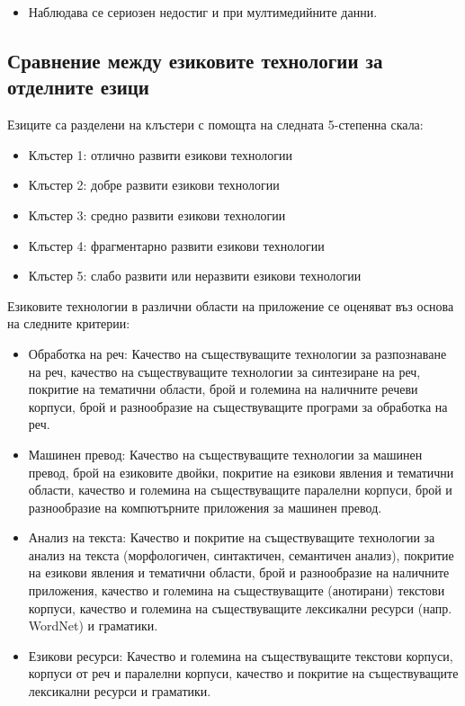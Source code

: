 \begin{multicols}{2}
\begin{itemize}
\item Наблюдава се сериозен недостиг и при мултимедийните данни.

\end{itemize}


\subsection{Сравнение между езиковите технологии за отделните езици}

Езиците са разделени на клъстери с помощта на следната 5-степенна скала:
\begin{itemize}
\item Клъстер 1: отлично развити езикови технологии
\item Клъстер 2: добре развити езикови технологии
\item Клъстер 3: средно развити езикови технологии
\item Клъстер 4: фрагментарно развити езикови технологии
\item Клъстер 5: слабо развити или неразвити езикови технологии
\end{itemize}

Езиковите технологии в различни области на приложение се оценяват въз основа на следните критерии:
\begin{itemize}
\item Обработка на реч: Качество на съществуващите технологии за разпознаване на реч, качество на съществуващите технологии за синтезиране на реч, покритие на тематични области, брой и големина на наличните речеви корпуси, брой и разнообразие на съществуващите програми за обработка на реч.
\item Машинен превод: Качество на съществуващите технологии за машинен превод, брой на езиковите двойки, покритие на езикови явления и тематични области, качество и големина на съществуващите паралелни корпуси, брой и разнообразие на компютърните приложения за машинен превод.
\item Анализ на текста: Качество и покритие на съществуващите технологии за анализ на текста (морфологичен, синтактичен, семантичен анализ), покритие на езикови явления и тематични области, брой и разнообразие на наличните приложения, качество и големина на съществуващите (анотирани) текстови корпуси, качество и големина на съществуващите лексикални ресурси (напр. WordNet) и граматики.
\item  Езикови ресурси: Качество и големина на съществуващите текстови корпуси, корпуси от реч и паралелни корпуси, качество и покритие на съществуващите лексикални ресурси и граматики.
\end{itemize} 


\end{multicols}
